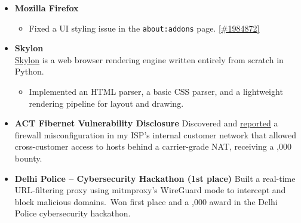 \documentclass[11pt]{article}
\begin{document}
\begin{tblr}
\begin{itemize}[topsep=0pt,leftmargin=15pt]
            \item \textbf{Mozilla Firefox}\\
            \begin{itemize}[nosep,left=0pt..1em]
                \item Fixed a UI styling issue in the \texttt{about:addons} page.
                \href{https://bugzilla.mozilla.org/show_bug.cgi?id=1984872}{\color{blue} [\#1984872]}
            \end{itemize}


            \item \textbf{Skylon}\\
            \href{https://github.com/sujaldev/skylon}{\color{blue}Skylon} is a web browser rendering engine
            written entirely from scratch in Python.
            \begin{itemize}[nosep,left=0pt..1em]
                \item Implemented an HTML parser, a basic CSS parser, and a lightweight rendering pipeline for layout
                and drawing.
            \end{itemize}


            \item \textbf{ACT Fibernet Vulnerability Disclosure}\newline
            Discovered and
            \href{https://pdf.sujal.dev/act/report.pdf}{\color{blue} reported}
            a firewall misconfiguration in my ISP's internal customer network that allowed cross-customer access to
            hosts behind a carrier-grade NAT, receiving a ,000 bounty.


            \item \textbf{Delhi Police -- Cybersecurity Hackathon (1st place)}\newline
            Built a real-time URL-filtering proxy using mitmproxy’s WireGuard mode to intercept and block malicious
            domains.\ Won first place and a ,000 award in the Delhi Police cybersecurity hackathon.


\end{itemize}
\end{tblr}
\end{document}
